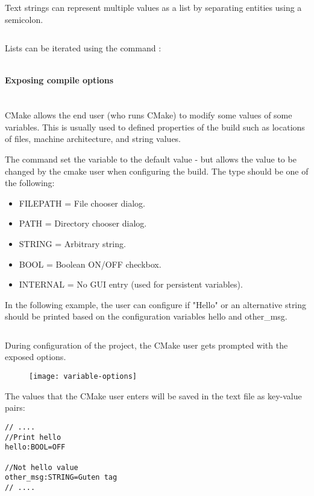 \documentclass[11pt,letter,landscape]{scrartcl} %
\newcommand{\sectiontitle}[1]{\paragraph{#1} \ \\} %
\begin{document}
\begin{multicols}{2}
Text strings can represent multiple values as a list by separating entities using a semicolon.

\inputminted{cmake}{examples/example3/CMakeLists.txt}

Lists can be iterated using the command :

\inputminted{cmake}{examples/example4/CMakeLists.txt}

\sectiontitle{Exposing compile options}

CMake allows the end user (who runs CMake) to modify some values of some variables.  This is usually used to defined properties of the build such as locations of files, machine architecture, and string values.

The command  set the variable to the default value - but allows the value to be changed by the cmake user when configuring the build. The type should be one of the following:

\begin{itemize}
\item FILEPATH = File chooser dialog.
\item PATH     = Directory chooser dialog.
\item STRING   = Arbitrary string.
\item BOOL     = Boolean ON/OFF checkbox.
\item INTERNAL = No GUI entry (used for persistent variables).
\end{itemize}

In the following example, the user can configure if "Hello" or an alternative string should be printed based on the configuration variables hello and other\_msg.

\inputminted{cmake}{examples/example5/CMakeLists.txt}

During configuration of the project, the CMake user gets prompted with the exposed options.
\begin{figure}[H]
    \centering
    \texttt{[image: variable-options]}
\end{figure}

The values that the CMake user enters will be saved in the text file  as key-value pairs:

\begin{verbatim}
// ....
//Print hello
hello:BOOL=OFF

//Not hello value
other_msg:STRING=Guten tag
// ....
\end{verbatim}


\end{multicols}
\end{document}
